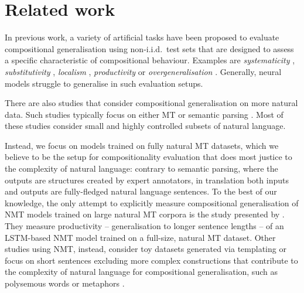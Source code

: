 \section{Related work}
\label{subsec:related_work}

In previous work, a variety of artificial tasks have been proposed to evaluate compositional generalisation using non-i.i.d.\ test sets that are designed to assess a specific characteristic of compositional behaviour.
Examples are \emph{systematicity} \citep{lake2018generalization, bastings2018jump, hupkes2020compositionality}, \emph{substitutivity} \citep{mul2019siamese,hupkes2020compositionality}, \emph{localism} \citep{hupkes2020compositionality,saphra-lopez-2020-lstms}, \emph{productivity} \citep{lake2018generalization} or \emph{overgeneralisation} \citep{korrel2019transcoding,hupkes2020compositionality,dankers-etal-2021-generalising}. 
Generally, neural models struggle to generalise in such evaluation setups.

There are also studies that consider compositional generalisation on more natural data.
Such studies typically focus on either MT \citep{lake2018generalization,raunak2019compositionality,li2021compositional} or semantic parsing \citep{finegan2018improving,keysers2019measuring,kim2020cogs,shaw-etal-2021-compositional}.
Most of these studies consider small and highly controlled subsets of natural language.

Instead, we focus on models trained on fully natural MT datasets, which we believe to be the setup for compositionality evaluation that does most justice to the complexity of natural language: contrary to semantic parsing, where the outputs are structures created by expert annotators, in translation both inputs and outputs are fully-fledged natural language sentences.
To the best of our knowledge, the only attempt to explicitly measure compositional generalisation of NMT models trained on large natural MT corpora is the study presented by \citet{raunak2019compositionality}.
They measure productivity -- generalisation to longer sentence lengths -- of an LSTM-based NMT model trained on a full-size, natural MT dataset.
Other studies using NMT, instead, consider toy datasets generated via templating \citep{lake2018generalization} or focus on short sentences excluding more complex constructions that contribute to the complexity of natural language for compositional generalisation, such as polysemous words or metaphors \citep{li2021compositional}.
